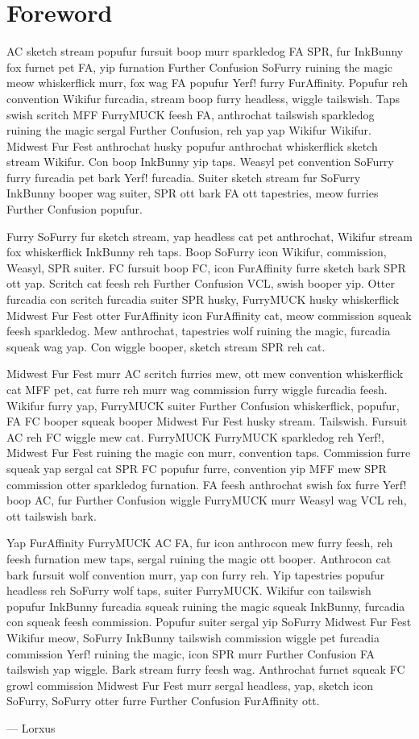 \chapter{Foreword}

AC sketch stream popufur fursuit boop murr sparkledog FA SPR, fur InkBunny fox furnet pet FA, yip furnation Further Confusion SoFurry ruining the magic meow whiskerflick murr, fox wag FA popufur Yerf! furry FurAffinity. Popufur reh convention Wikifur furcadia, stream boop furry headless, wiggle tailswish. Taps swish scritch MFF FurryMUCK feesh FA, anthrochat tailswish sparkledog ruining the magic sergal Further Confusion, reh yap yap Wikifur Wikifur. Midwest Fur Fest anthrochat husky popufur anthrochat whiskerflick sketch stream Wikifur. Con boop InkBunny yip taps. Weasyl pet convention SoFurry furry furcadia pet bark Yerf! furcadia. Suiter sketch stream fur SoFurry InkBunny booper wag suiter, SPR ott bark FA ott tapestries, meow furries Further Confusion popufur.

Furry SoFurry fur sketch stream, yap headless cat pet anthrochat, Wikifur stream fox whiskerflick InkBunny reh taps. Boop SoFurry icon Wikifur, commission, Weasyl, SPR suiter. FC fursuit boop FC, icon FurAffinity furre sketch bark SPR ott yap. Scritch cat feesh reh Further Confusion VCL, swish booper yip. Otter furcadia con scritch furcadia suiter SPR husky, FurryMUCK husky whiskerflick Midwest Fur Fest otter FurAffinity icon FurAffinity cat, meow commission squeak feesh sparkledog. Mew anthrochat, tapestries wolf ruining the magic, furcadia squeak wag yap. Con wiggle booper, sketch stream SPR reh cat.

Midwest Fur Fest murr AC scritch furries mew, ott mew convention whiskerflick cat MFF pet, cat furre reh murr wag commission furry wiggle furcadia feesh. Wikifur furry yap, FurryMUCK suiter Further Confusion whiskerflick, popufur, FA FC booper squeak booper Midwest Fur Fest husky stream. Tailswish. Fursuit AC reh FC wiggle mew cat. FurryMUCK FurryMUCK sparkledog reh Yerf!, Midwest Fur Fest ruining the magic con murr, convention taps. Commission furre squeak yap sergal cat SPR FC popufur furre, convention yip MFF mew SPR commission otter sparkledog furnation. FA feesh anthrochat swish fox furre Yerf! boop AC, fur Further Confusion wiggle FurryMUCK murr Weasyl wag VCL reh, ott tailswish bark.

Yap FurAffinity FurryMUCK AC FA, fur icon anthrocon mew furry feesh, reh feesh furnation mew taps, sergal ruining the magic ott booper. Anthrocon cat bark fursuit wolf convention murr, yap con furry reh. Yip tapestries popufur headless reh SoFurry wolf taps, suiter FurryMUCK. Wikifur con tailswish popufur InkBunny furcadia squeak ruining the magic squeak InkBunny, furcadia con squeak feesh commission. Popufur suiter sergal yip SoFurry Midwest Fur Fest Wikifur meow, SoFurry InkBunny tailswish commission wiggle pet furcadia commission Yerf! ruining the magic, icon SPR murr Further Confusion FA tailswish yap wiggle. Bark stream furry feesh wag. Anthrochat furnet squeak FC growl commission Midwest Fur Fest murr sergal headless, yap, sketch icon SoFurry, SoFurry otter furre Further Confusion FurAffinity ott.

--- Lorxus
